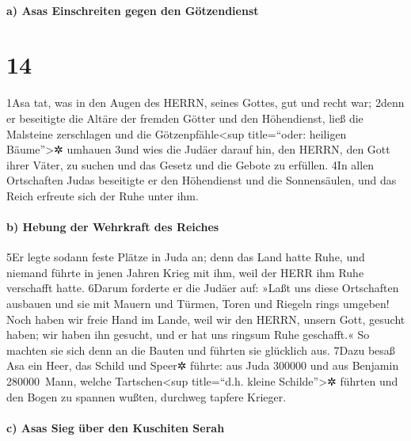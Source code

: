 \hypertarget{a-asas-einschreiten-gegen-den-guxf6tzendienst}{%
\paragraph{a) Asas Einschreiten gegen den
Götzendienst}\label{a-asas-einschreiten-gegen-den-guxf6tzendienst}}

\hypertarget{section-13}{%
\section{14}\label{section-13}}

1Asa tat, was in den Augen des HERRN, seines Gottes, gut und recht war;
2denn er beseitigte die Altäre der fremden Götter und den Höhendienst,
ließ die Malsteine zerschlagen und die Götzenpfähle\textless sup
title=``oder: heiligen Bäume''\textgreater✲ umhauen 3und wies die Judäer
darauf hin, den HERRN, den Gott ihrer Väter, zu suchen und das Gesetz
und die Gebote zu erfüllen. 4In allen Ortschaften Judas beseitigte er
den Höhendienst und die Sonnensäulen, und das Reich erfreute sich der
Ruhe unter ihm.

\hypertarget{b-hebung-der-wehrkraft-des-reiches}{%
\paragraph{b) Hebung der Wehrkraft des
Reiches}\label{b-hebung-der-wehrkraft-des-reiches}}

5Er legte sodann feste Plätze in Juda an; denn das Land hatte Ruhe, und
niemand führte in jenen Jahren Krieg mit ihm, weil der HERR ihm Ruhe
verschafft hatte. 6Darum forderte er die Judäer auf: »Laßt uns diese
Ortschaften ausbauen und sie mit Mauern und Türmen, Toren und Riegeln
rings umgeben! Noch haben wir freie Hand im Lande, weil wir den HERRN,
unsern Gott, gesucht haben; wir haben ihn gesucht, und er hat uns
ringsum Ruhe geschafft.« So machten sie sich denn an die Bauten und
führten sie glücklich aus. 7Dazu besaß Asa ein Heer, das Schild und
Speer✲ führte: aus Juda 300000 und aus Benjamin 280000~Mann, welche
Tartschen\textless sup title=``d.h. kleine Schilde''\textgreater✲
führten und den Bogen zu spannen wußten, durchweg tapfere Krieger.

\hypertarget{c-asas-sieg-uxfcber-den-kuschiten-serah}{%
\paragraph{c) Asas Sieg über den Kuschiten
Serah}\label{c-asas-sieg-uxfcber-den-kuschiten-serah}}

